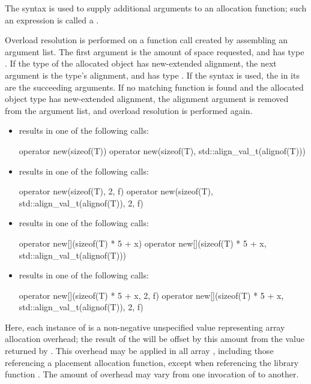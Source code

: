\pnum
{}%
The  syntax is used to supply additional
arguments to an allocation function; such an expression is called
a .

\pnum
Overload resolution is
performed on a function call created by assembling an argument list.
The first argument is
the amount of space requested,
and has type .
If the type of the allocated object has new-extended alignment,
the next argument is
the type's alignment,
and has type .
If the  syntax is used,
the 
in its 
are the succeeding arguments.
If no matching function is found
and the allocated object type has new-extended alignment,
the alignment argument is removed from the argument list,
and overload resolution is performed again.

\pnum
\begin{example}
\begin{itemize}
\item {} results in one of the following calls:
\begin{codeblock}
operator new(sizeof(T))
operator new(sizeof(T), std::align_val_t(alignof(T)))
\end{codeblock}
\item {} results in one of the following calls:
\begin{codeblock}
operator new(sizeof(T), 2, f)
operator new(sizeof(T), std::align_val_t(alignof(T)), 2, f)
\end{codeblock}
\item {} results in one of the following calls:
\begin{codeblock}
operator new[](sizeof(T) * 5 + x)
operator new[](sizeof(T) * 5 + x, std::align_val_t(alignof(T)))
\end{codeblock}
\item {} results in one of the following calls:
\begin{codeblock}
operator new[](sizeof(T) * 5 + x, 2, f)
operator new[](sizeof(T) * 5 + x, std::align_val_t(alignof(T)), 2, f)
\end{codeblock}
\end{itemize}
Here, each instance of  is a non-negative unspecified value
representing array allocation overhead; the result of the
 will be offset by this amount from the value
returned by . This overhead may be applied in all
array , including those referencing
a placement allocation function, except when referencing
the library function .
The amount of overhead may vary from one
invocation of  to another.
\end{example}

